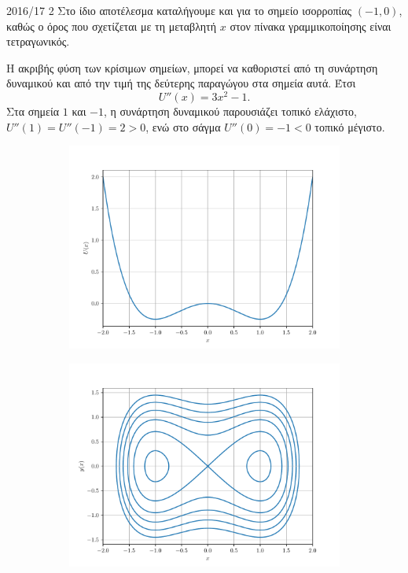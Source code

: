 \begin{solution}{2016/17 2}
    Στο ίδιο αποτέλεσμα καταλήγουμε και για το σημείο ισορροπίας \( (-1,
    0) \), καθώς ο όρος που σχετίζεται με τη μεταβλητή \(x\) στον πίνακα
    γραμμικοποίησης είναι τετραγωνικός.

    Η ακριβής φύση των κρίσιμων σημείων, μπορεί να καθοριστεί από τη συνάρτηση δυναμικού
    και από την τιμή της δεύτερης παραγώγου στα σημεία αυτά. Έτσι
    \begin{equation*}
        U''(x) = 3x^2 - 1.
    \end{equation*}
    Στα σημεία \( 1 \) και \( -1 \), η συνάρτηση δυναμικού παρουσιάζει τοπικό
    ελάχιστο, \( U''(1) = U''(-1) = 2 > 0 \), ενώ στο σάγμα \( U''(0) = -1 < 0
    \) τοπικό μέγιστο.

    \begin{figure}[h!]
        \centering
        \begin{subfigure}[b]{0.8\textwidth}
            \includegraphics[width=\textwidth]{figures/ex2_undampedDuffingU.pdf}
        \end{subfigure}
        \begin{subfigure}[b]{0.8\textwidth}
            \includegraphics[width=\textwidth]{figures/ex2_undampedDuffingPor.pdf}

\end{subfigure}
\end{figure}
\end{solution}
